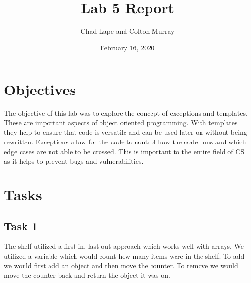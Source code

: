 \documentclass[11pt]{article}
\title{Lab 5 Report}
\author{Chad Lape and Colton Murray}
\date{February 16, 2020}
\begin{document}
	\maketitle
	\section{Objectives}
	The objective of this lab was to explore the concept of exceptions and templates. These are important aspects of object oriented programming. With templates they help to ensure that code is versatile and can be used later on without being rewritten. Exceptions allow for the code to control how the code runs and which edge cases are not able to be crossed. This is important to the entire field of CS as it helps to prevent bugs and vulnerabilities. 
	\section {Tasks}
	\subsection{Task 1}
	The shelf utilized a first in, last out approach which works well with arrays. We utilized a variable which would count how many items were in the shelf. To add we would first add an object and then move the counter. To remove we would move the counter back and return the object it was on.
	\newpage
\end{document}
